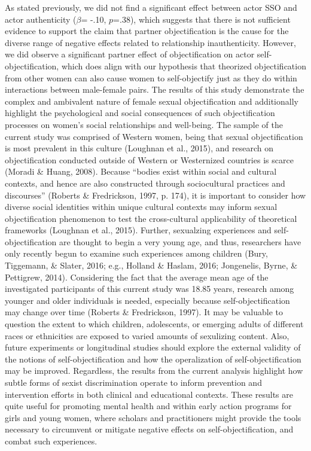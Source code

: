 \documentclass[man]{apa6}
\begin{document}
As stated previously, we did not find a significant effect between actor
SSO and actor authenticity (\(\beta\)= -.10, \(p\)=.38), which suggests
that there is not sufficient evidence to support the claim that partner
objectification is the cause for the diverse range of negative effects
related to relationship inauthenticity. However, we did observe a
significant partner effect of objectification on actor
self-objectification, which does align with our hypothesis that
theorized objectification from other women can also cause women to
self-objectify just as they do within interactions between male-female
pairs. The results of this study demonstrate the complex and ambivalent
nature of female sexual objectification and additionally highlight the
psychological and social consequences of such objectification processes
on women's social relationships and well-being. The sample of the
current study was comprised of Western women, being that sexual
objectification is most prevalent in this culture (Loughnan et al.,
2015), and research on objectification conducted outside of Western or
Westernized countries is scarce (Moradi \& Huang, 2008). Because
\enquote{bodies exist within social and cultural contexts, and hence are
also constructed through sociocultural practices and discourses}
(Roberts \& Fredrickson, 1997, p. 174), it is important to consider how
diverse social identities within unique cultural contexts may inform
sexual objectification phenomenon to test the cross-cultural
applicability of theoretical frameworks (Loughnan et al., 2015).
Further, sexualzing experiences and self-objectification are thought to
begin a very young age, and thus, researchers have only recently begun
to examine such experiences among children (Bury, Tiggemann, \& Slater,
2016; e.g., Holland \& Haslam, 2016; Jongenelis, Byrne, \& Pettigrew,
2014). Considering the fact that the average mean age of the
investigated participants of this current study was 18.85 years,
research among younger and older individuals is needed, especially
because self-objectification may change over time (Roberts \&
Fredrickson, 1997). It may be valuable to question the extent to which
children, adolescents, or emerging adults of different races or
ethnicities are exposed to varied amounts of sexulizing content. Also,
future experiments or longitudinal studies should explore the external
validity of the notions of self-objectification and how the
operalization of self-objectification may be improved. Regardless, the
results from the current analysis highlight how subtle forms of sexist
discrimination operate to inform prevention and intervention efforts in
both clinical and educational contexts. These results are quite useful
for promoting mental health and within early action programs for girls
and young women, where scholars and practitioners might provide the
tools necessary to circumvent or mitigate negative effects on
self-objectification, and combat such experiences.
\end{document}
